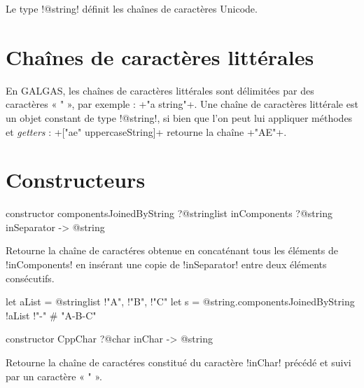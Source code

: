 



Le type \ggs!@string! définit les chaînes de caractères Unicode.

\section{Chaînes de caractères littérales}

En GALGAS, les chaînes de caractères littérales sont délimitées par des caractères « " », par exemple : \ggs+"a string"+. Une chaîne de caractères littérale est un objet constant de type \ggs!@string!, si bien que l'on peut lui appliquer méthodes et \emph{getters} : \ggs+["ae" uppercaseString]+ retourne la chaîne \ggs+"AE"+.







\section{Constructeurs}


\begin{galgasbox}
constructor componentsJoinedByString
   ?@stringlist inComponents
   ?@string inSeparator -> @string
\end{galgasbox}

Retourne la chaîne de caractéres obtenue en concaténant tous les éléments de \ggs!inComponents! en insérant une copie de \ggs!inSeparator! entre deux éléments consécutifs.

\begin{galgas}
let aList = @stringlist {!"A", !"B", !"C"}
let s = @string.componentsJoinedByString {!aList !"-"} # "A-B-C"
\end{galgas}





\begin{galgasbox}
constructor CppChar ?@char inChar -> @string
\end{galgasbox}

Retourne la chaîne de caractéres constitué du caractère \ggs!inChar! précédé et suivi par un caractère « " ».


